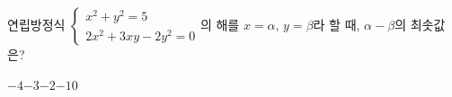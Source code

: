 연립방정식 $\begin{cases} x^2+y^2=5 \\ 2x^2+3xy-2y^2=0 \end{cases}$의 해를 $x=\alpha$, $y=\beta$라 할 때, $\alpha-\beta$의 최솟값은?
\begin{choices32}{$-4$}{$-3$}{$-2$}{$-1$}{$0$}\end{choices32}
